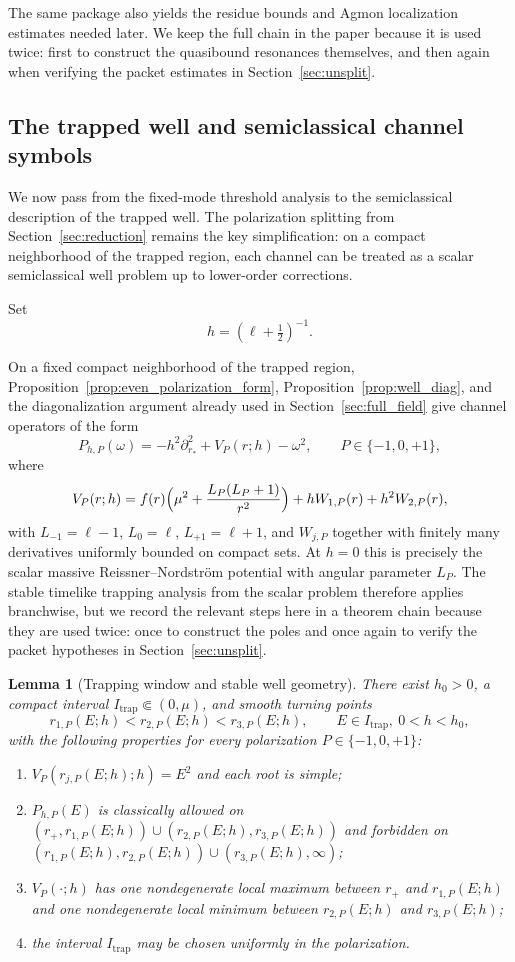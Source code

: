 \documentclass[12pt]{article}
\numberwithin{equation}{section}
\theoremstyle{plain}
\newtheorem{lemma}[theorem]{Lemma}
\theoremstyle{definition}
\theoremstyle{remark}
\begin{document}
The same package also yields the residue bounds and Agmon localization estimates needed later.  We keep the full chain in the paper because it is used twice: first to construct the quasibound resonances themselves, and then again when verifying the packet estimates in Section~\ref{sec:unsplit}.

\subsection{The trapped well and semiclassical channel symbols}

We now pass from the fixed-mode threshold analysis to the semiclassical description of the trapped well.  The polarization splitting from Section~\ref{sec:reduction} remains the key simplification: on a compact neighborhood of the trapped region, each channel can be treated as a scalar semiclassical well problem up to lower-order corrections.

Set
\[
   h=(\ell+\tfrac12)^{-1}.
\]

On a fixed compact neighborhood of the trapped region, Proposition~\ref{prop:even_polarization_form}, Proposition~\ref{prop:well_diag}, and the diagonalization argument already used in Section~\ref{sec:full_field} give channel operators of the form
\[
   P_{h,P}(\omega)
   =
   -h^2\partial_{r_*}^2+V_P(r;h)-\omega^2,
   \qquad P\in\{-1,0,+1\},
\]
where
\[
   V_P(r;h)
   =
   f(r)\Bigl(\mu^2+\frac{L_P(L_P+1)}{r^2}\Bigr)
   +hW_{1,P}(r)+h^2W_{2,P}(r),
\]
with $L_{-1}=\ell-1$, $L_0=\ell$, $L_{+1}=\ell+1$, and $W_{j,P}$ together with finitely many derivatives uniformly bounded on compact sets.  At $h=0$ this is precisely the scalar massive Reissner--Nordstr\"om potential with angular parameter $L_P$.  The stable timelike trapping analysis from the scalar problem therefore applies branchwise, but we record the relevant steps here in a theorem chain because they are used twice: once to construct the poles and once again to verify the packet hypotheses in Section~\ref{sec:unsplit}.

\begin{lemma}[Trapping window and stable well geometry]\label{lem:qb_trapping_window}
There exist $h_0>0$, a compact interval $I_{\mathrm{trap}}\Subset(0,\mu)$, and smooth turning points
\[
   r_{1,P}(E;h)<r_{2,P}(E;h)<r_{3,P}(E;h),
   \qquad E\in I_{\mathrm{trap}},\ 0<h<h_0,
\]
with the following properties for every polarization $P\in\{-1,0,+1\}$:
\begin{enumerate}[label=\textnormal{(\roman*)}]
   \item $V_P(r_{j,P}(E;h);h)=E^2$ and each root is simple;
   \item $P_{h,P}(E)$ is classically allowed on $(r_+,r_{1,P}(E;h))\cup(r_{2,P}(E;h),r_{3,P}(E;h))$ and forbidden on $(r_{1,P}(E;h),r_{2,P}(E;h))\cup(r_{3,P}(E;h),\infty)$;
   \item $V_P(\cdot;h)$ has one nondegenerate local maximum between $r_+$ and $r_{1,P}(E;h)$ and one nondegenerate local minimum between $r_{2,P}(E;h)$ and $r_{3,P}(E;h)$;
   \item the interval $I_{\mathrm{trap}}$ may be chosen uniformly in the polarization.
\end{enumerate}
\end{lemma}
\end{document}
